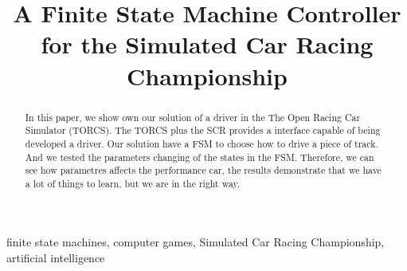 \documentclass[journal]{IEEEtran}%
\begin{document}
	\title{A Finite State Machine Controller for the Simulated Car Racing Championship}

\author{
	}

%
{}%

\maketitle

\begin{abstract}
In this paper, we show own our solution of a driver in the The Open Racing Car Simulator (TORCS). The TORCS plus the SCR provides a interface capable of being developed a driver. Our solution have a FSM to choose how to drive a piece of track. And we tested the parameters changing of the states in the FSM. Therefore, we can see how parametres affects the performance car, the results demonstrate that we have a lot of things to learn, but we are in the right way.
\end{abstract}

\begin{IEEEkeywords}
finite state machines, computer games, Simulated Car Racing Championship, artificial intelligence
\end{IEEEkeywords}%

%
%
%
%
%
%
%

%
%
\end{document}
